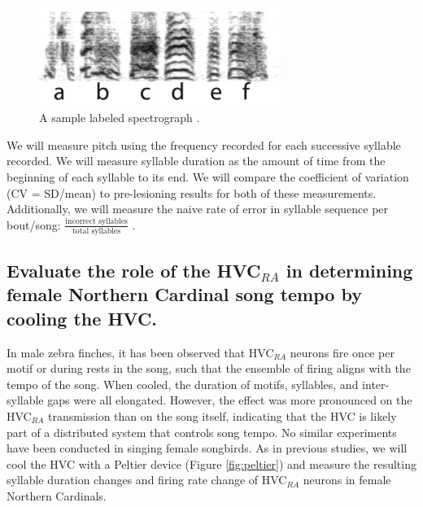 \documentclass[12pt]{article}
\begin{document}
\begin{figure}[ht]
\centering
\includegraphics[width=0.7\textwidth]{sample_spectrograph.png}
\caption{\label{fig:spectrograph}A sample labeled spectrograph \cite{Moorman}.}
\end{figure}

We will measure pitch using the frequency recorded for each successive syllable recorded. We will measure syllable duration as the amount of time from the beginning of each syllable to its end. We will compare the coefficient of variation (CV = SD/mean) to pre-lesioning results for both of these measurements. Additionally, we will measure the naive rate of error in syllable sequence per bout/song: $\frac{\text{incorrect syllables}}{\text{total syllables}}$ \cite{Moorman}.

\subsection{Evaluate the role of the HVC$_{RA}$ in determining female Northern Cardinal song tempo by cooling the HVC.}

In male zebra finches, it has been observed that HVC$_{RA}$ neurons fire once per motif or during rests in the song, such that the ensemble of firing aligns with the tempo of the song. When cooled, the duration of motifs, syllables, and inter-syllable gaps were all elongated. However, the effect was more pronounced on the HVC$_{RA}$ transmission than on the song itself, indicating that the HVC is likely part of a distributed system that controls song tempo. No similar experiments have been conducted in singing female songbirds. As in previous studies, we will cool the HVC with a Peltier device (Figure \ref{fig:peltier}) and measure the resulting syllable duration changes  and firing rate change of HVC$_{RA}$ neurons in female Northern Cardinals. 
\end{document}
